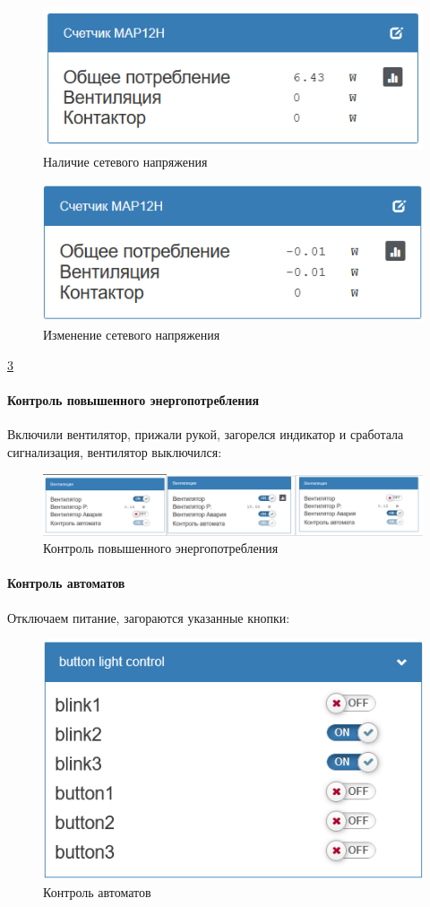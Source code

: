 \documentclass[a4paper,14pt]{extarticle}
\begin{document}
\begin{figure}[hbpt]
	\centering
	\includegraphics[width=0.5\linewidth]{images/net1}
	\caption{Наличие сетевого напряжения}
	\label{fig:net1}
\end{figure}
\newpage
\begin{figure}[hbpt]
	\centering
	\includegraphics[width=0.5\linewidth]{images/net2}
	\caption{Изменение сетевого напряжения}
	\label{fig:net2}
\end{figure}

\ref{fig:fan-gui}
\paragraph{Контроль повышенного энергопотребления}
Включили вентилятор, прижали рукой, загорелся индикатор и сработала сигнализация, вентилятор выключился:
\begin{figure}[hbpt]
	\centering
	\includegraphics[width=0.6\linewidth]{images/fan-gui}
	\caption{Контроль повышенного энергопотребления}
	\label{fig:fan-gui}
\end{figure}

\paragraph{Контроль автоматов}
Отключаем питание, загораются указанные кнопки:

\begin{figure}[hbpt]
	\centering
	\includegraphics[width=0.5\linewidth]{images/auto-gui}
	\caption{Контроль автоматов}
	\label{fig:auto-gui}
\end{figure}
\end{document}
